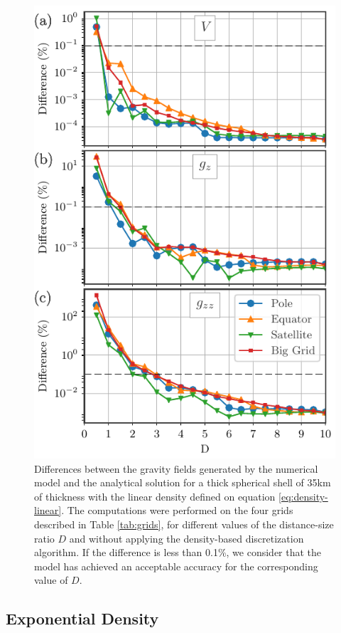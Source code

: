 \documentclass[extra]{gji}
\begin{document}
\begin{figure}
\centering
\includegraphics[width=0.9\linewidth]{figures/linear-D-thick.pdf}
\caption{
    Differences between the gravity fields generated by the numerical 
    model and the analytical solution for a thick spherical shell of 
    35km of thickness with the linear density defined on equation 
    \ref{eq:density-linear}.
    The computations were performed on the four grids described in 
    Table \ref{tab:grids}, for different values of the distance-size 
    ratio $D$ and without applying the density-based discretization 
    algorithm.
    If the difference is less than 0.1\%, we consider that the model 
    has achieved an acceptable accuracy for the corresponding value of 
    $D$.
    }
\label{fig:D-linear-thick}
\end{figure}


\subsection{Exponential Density}
\end{document}
